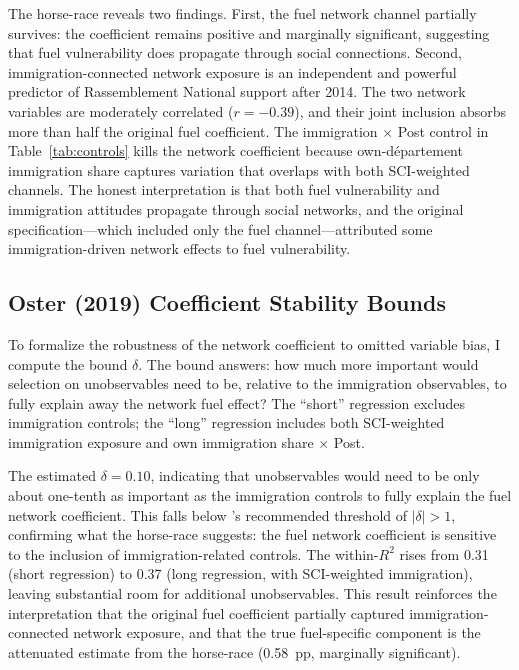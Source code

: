 \documentclass[12pt]{article}
\newcommand{\rn}{Rassemblement National}
\newcommand{\dept}{d\'{e}partement}
\begin{document}
The horse-race reveals two findings. First, the fuel network channel partially survives: the coefficient remains positive and marginally significant, suggesting that fuel vulnerability does propagate through social connections. Second, immigration-connected network exposure is an independent and powerful predictor of \rn{} support after 2014. The two network variables are moderately correlated ($r = -0.39$), and their joint inclusion absorbs more than half the original fuel coefficient. The immigration $\times$ Post control in Table~\ref{tab:controls} kills the network coefficient because own-\dept{} immigration share captures variation that overlaps with both SCI-weighted channels. The honest interpretation is that both fuel vulnerability and immigration attitudes propagate through social networks, and the original specification---which included only the fuel channel---attributed some immigration-driven network effects to fuel vulnerability.



\subsection{Oster (2019) Coefficient Stability Bounds}

To formalize the robustness of the network coefficient to omitted variable bias, I compute the \citet{oster2019unobservable} bound $\delta$. The bound answers: how much more important would selection on unobservables need to be, relative to the immigration observables, to fully explain away the network fuel effect? The ``short'' regression excludes immigration controls; the ``long'' regression includes both SCI-weighted immigration exposure and own immigration share $\times$ Post.

The estimated $\delta = 0.10$, indicating that unobservables would need to be only about one-tenth as important as the immigration controls to fully explain the fuel network coefficient. This falls below \citet{oster2019unobservable}'s recommended threshold of $|\delta| > 1$, confirming what the horse-race suggests: the fuel network coefficient is sensitive to the inclusion of immigration-related controls. The within-$R^2$ rises from 0.31 (short regression) to 0.37 (long regression, with SCI-weighted immigration), leaving substantial room for additional unobservables. This result reinforces the interpretation that the original fuel coefficient partially captured immigration-connected network exposure, and that the true fuel-specific component is the attenuated estimate from the horse-race (0.58~pp, marginally significant).
\end{document}
